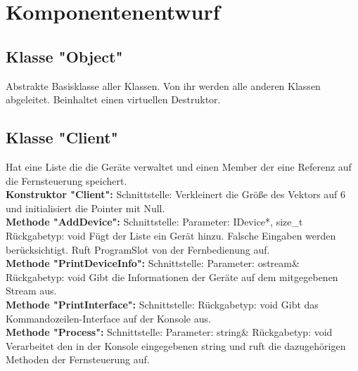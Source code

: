 \documentclass[12pt,a4paper]{article}
\begin{document}
\newpage
\section {Komponentenentwurf}
\subsection {Klasse "Object"}
Abstrakte Basisklasse aller Klassen. Von ihr werden alle anderen Klassen abgeleitet. Beinhaltet einen virtuellen Destruktor.

\subsection {Klasse "Client"}
Hat eine Liste die die Geräte verwaltet und einen Member der eine Referenz auf die Fernsteuerung speichert.
\\

\textbf {Konstruktor "Client": } 
\newline
Schnittstelle:
\newline
Verkleinert die Größe des Vektors auf 6 und initialisiert die Pointer mit Null.
\\

\textbf {Methode "AddDevice": } 
\newline
Schnittstelle:
\newline
Parameter: IDevice*, size\_t
\newline
Rückgabetyp: void
\newline
Fügt der Liste ein Gerät hinzu. Falsche Eingaben werden berücksichtigt. Ruft ProgramSlot von der Fernbedienung auf.
\\

\textbf {Methode "PrintDeviceInfo": } 
\newline
Schnittstelle:
\newline
Parameter: ostream\&
\newline
Rückgabetyp: void
\newline
Gibt die Informationen der Geräte auf dem mitgegebenen Stream aus.
\\

\textbf {Methode "PrintInterface": } 
\newline
Schnittstelle:
\newline
Rückgabetyp: void
\newline
Gibt das Kommandozeilen-Interface auf der Konsole aus.
\\

\textbf {Methode "Process": } 
\newline
Schnittstelle:
\newline
Parameter: string\&
\newline
Rückgabetyp: void
\newline
Verarbeitet den in der Konsole eingegebenen string und ruft die dazugehörigen Methoden der Fernsteuerung auf.
\\
\end{document}
